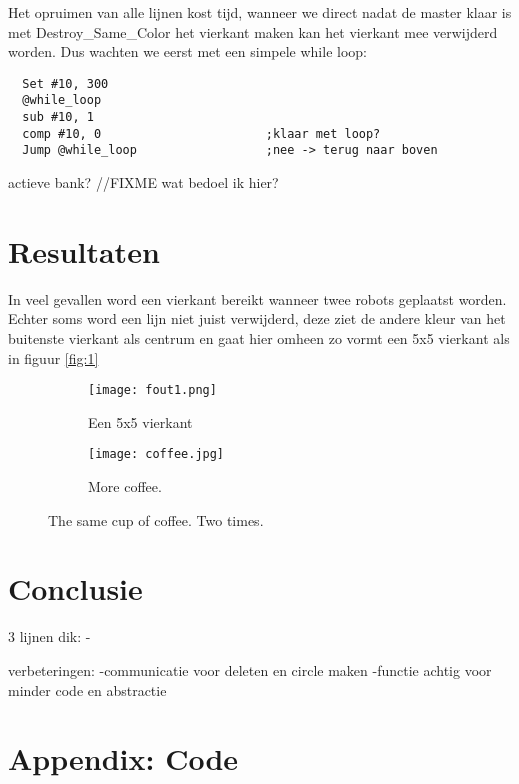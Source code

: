 \documentclass[10pt]{article}
\begin{document}
Het opruimen van alle lijnen kost tijd, wanneer we direct nadat de master klaar is met Destroy\_Same\_Color het vierkant maken kan het vierkant mee verwijderd worden. Dus wachten we eerst met een simpele while loop: 

\begin{verbatim}
  Set #10, 300
  @while_loop
  sub #10, 1
  comp #10, 0                       ;klaar met loop?
  Jump @while_loop                  ;nee -> terug naar boven
\end{verbatim}

actieve bank? //FIXME wat bedoel ik hier?

\pagebreak

\section{Resultaten} 

In veel gevallen word een vierkant bereikt wanneer twee robots geplaatst worden. Echter soms word een lijn niet juist verwijderd, deze ziet de andere kleur van het buitenste vierkant als centrum en gaat hier omheen zo vormt een 5x5 vierkant als in figuur \ref{fig:1}

\begin{figure}[h!]
  \centering
  \begin{subfigure}[b]{0.4\linewidth}
    \texttt{[image: fout1.png]}
    \caption{Een 5x5 vierkant}
  \end{subfigure}
  \begin{subfigure}[b]{0.4\linewidth}
    \texttt{[image: coffee.jpg]}
    \caption{More coffee.}
  \end{subfigure}
  \caption{The same cup of coffee. Two times.}
  \label{fig:coffee}
\end{figure}



\section{Conclusie}

3 lijnen dik:
-

verbeteringen:
-communicatie voor deleten en circle maken
-functie achtig voor minder code en abstractie




\pagebreak
\section*{Appendix: Code}
\end{document}
